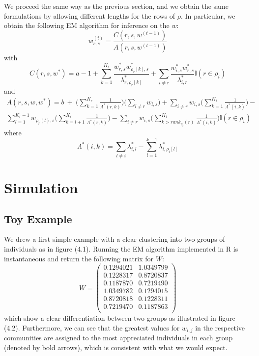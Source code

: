 \documentclass[12pt]{ociamthesis}  %
\begin{document}
	We proceed the same way as the previous section, and we obtain the same formulations by allowing different lengths for the rows of $\rho$. In particular, we obtain the following EM algorithm for inference on the $w$:
	\begin{equation}
	w^{(t)}_{r,s} = \frac{C(r,s,w^{(t-1)})}{A(r,s,w^{(t-1)})}
	\end{equation} with
	\begin{equation}
	C(r,s,w^{*}) = a - 1 + \sum_{k = 1}^{K_{r}}\frac{w^{*}_{r,s}w^{*}_{\rho_{r}[k],s}}{\lambda^{*}_{r,\rho_{r}[k]}} + \sum_{i \neq r} \frac{w^{*}_{i,s}w^{*}_{r,s}}{\lambda^{*}_{i,r}} \mathbb{I}(r \in \rho_{i})
	\end{equation} and
	\begin{multline}
	A(r,s,w,w^{*}) = b \ + \ \bigg( \sum_{k = 1}^{K_{r}} \frac{1}{\Lambda^{*}(r,k)} \bigg) \bigg( \sum_{l \neq r} w_{l,s} \bigg) + \sum_{i \neq r} w_{i,s} \bigg( \sum_{k = 1}^{K_{i}} \frac{1}{\Lambda^{*}(i,k)} \bigg) - \\ \sum_{l = 1}^{K_{r}-1} w_{\rho_{r}(l), s} \bigg( \sum_{k = l+1}^{K_{r}} \frac{1}{\Lambda^{*}(r,k)} \bigg) - \sum_{i \neq r} w_{i,s} \bigg( \sum_{k > rank_{\rho_{i}}(r)}^{K_{i}} \frac{1}{\Lambda^{*}(i,k)} \bigg)\mathbb{I}(r \in \rho_{i})
	\end{multline} where
	\begin{equation}
	\Lambda^{*}(i,k) = \sum_{l \neq i} \lambda^{*}_{i,l} - \sum_{l = 1}^{k-1} \lambda^{*}_{i,\rho_{i}[l]}
	\end{equation}
	
	\newpage
	\section{Simulation}
	
	\subsection{Toy Example}
	
	We drew a first simple example with a clear clustering into two groups of individuals as in figure (4.1). Running the EM algorithm implemented in R is instantaneous and return the following matrix for $W$:
	\begin{equation}
	W = 
	\begin{pmatrix}
	0.1294021 & 1.0349799 \\
	0.1228317 & 0.8720837 \\
	0.1187870 & 0.7219490 \\
	1.0349782 & 0.1294015 \\
	0.8720818 & 0.1228311 \\
	0.7219470 & 0.1187863 \\
	\end{pmatrix}
	\end{equation} which show a clear differentiation between two groups as illustrated in figure (4.2). Furthermore, we can see that the greatest values for $w_{i,j}$ in the respective communities are assigned to the most appreciated individuals in each group (denoted by bold arrows), which is consistent with what we would expect.
	
\end{document}

